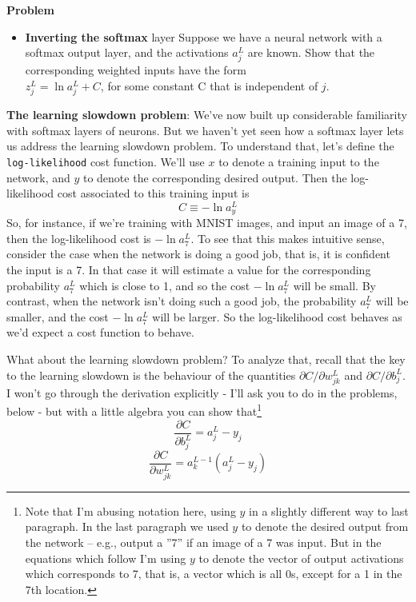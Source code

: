 \textbf{Problem}

\begin{itemize}
\item 
\textbf{Inverting the softmax} layer Suppose we have a neural network with a softmax output layer, and the activations $a^L_j$
are known. Show that the corresponding weighted inputs have the form \\$z_{j}^{L}=\ln a_{j}^{L}+C$, for some constant C that is independent of $j$.
\end{itemize}


\textbf{The learning slowdown problem}: We've now built up considerable familiarity with softmax layers of neurons. But we haven't yet seen how a softmax layer lets us address the learning slowdown problem. To understand that, let's define the \lstinline{log-likelihood} cost function. We'll use $x$ to denote a training input to the network, and $y$ to denote the corresponding desired output. Then the log-likelihood cost associated to this training input is 
\begin{equation}
C \equiv-\ln a_{y}^{L}
\label{eq:c03-80} 
\end{equation}
So, for instance, if we're training with MNIST images, and input an image of a 7, then the log-likelihood cost is $-\ln a_{7}^{L}$. To see that this makes intuitive sense, consider the case when the network is doing a good job, that is, it is confident the input is a 7. In that case it will estimate a value for the corresponding probability $a_{7}^{L}$ which is close to 1, and so the cost $-\ln a_{7}^{L}$ will be small. By contrast, when the network isn't doing such a good job, the probability $a_{7}^{L}$ will be smaller, and the cost $-\ln a_{7}^{L}$
will be larger. So the log-likelihood cost behaves as we'd expect a cost function to behave.

What about the learning slowdown problem? To analyze that, recall that the key to the learning slowdown is the behaviour of the quantities $\partial C / \partial w_{j k}^{L}$ and $\partial C / \partial b_{j}^{L}$. I won't go through the derivation explicitly - I'll ask you to do in the problems, below - but with a little algebra you can show that\footnote{Note that I'm abusing notation here, using $y$ in a slightly different way to last paragraph. In the last paragraph we used $y$ to denote the desired output from the network -- e.g., output a ''7'' if an image of a 7 was input. But in the equations which follow I'm using $y$ to denote the vector of output activations which corresponds to 7, that is, a vector which is all 0s, except for a 1 in the 7th location. }
\begin{equation}
\frac{\partial C}{\partial b_{j}^{L}}=a_{j}^{L}-y_{j}
\label{eq:c03-81} 
\end{equation}
\begin{equation}
\frac{\partial C}{\partial w_{j k}^{L}}=a_{k}^{L-1}\left(a_{j}^{L}-y_{j}\right)
\label{eq:c03-82} 
\end{equation}




